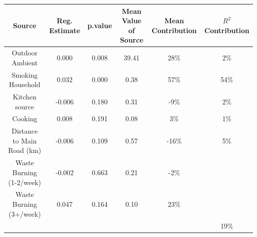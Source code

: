 
\begin{tabular}{cccccc}
\toprule
Source & Reg. Estimate & p.value & Mean Value of Source & Mean Contribution & $R^2$ Contribution\\
\midrule
Outdoor Ambient & 0.000 & 0.008 & 39.41 & 28\% & 2\%\\
Smoking Household & 0.032 & 0.000 & 0.38 & 57\% & 54\%\\
Kitchen source & -0.006 & 0.180 & 0.31 & -9\% & 2\%\\
Cooking & 0.008 & 0.191 & 0.08 & 3\% & 1\%\\
Distance to Main Road (km) & -0.006 & 0.109 & 0.57 & -16\% & 5\%\\
\addlinespace
Waste Burning (1-2/week) & -0.002 & 0.663 & 0.21 & -2\% & \\
Waste Burning (3+/week) & 0.047 & 0.164 & 0.10 & 23\% & \\
 &  &  &  &  & 19\%\\
\bottomrule
\end{tabular}
